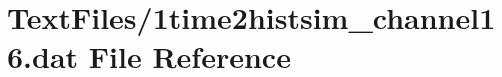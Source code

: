 \hypertarget{1time2histsim__channel16_8dat}{}\section{Text\+Files/1time2histsim\+\_\+channel16.dat File Reference}
\label{1time2histsim__channel16_8dat}
